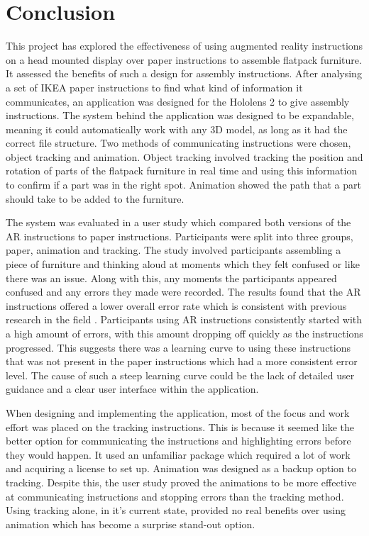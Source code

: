 \documentclass{l4proj}
\begin{document}
\chapter{Conclusion}  
\label{chap:conclusion}

This project has explored the effectiveness of using augmented reality instructions on a head mounted display over paper instructions to assemble flatpack furniture. It assessed the benefits of such a design for assembly instructions. After analysing a set of IKEA paper instructions to find what kind of information it communicates, an application was designed for the Hololens 2 to give assembly instructions. The system behind the application was designed to be expandable, meaning it could automatically work with any 3D model, as long as it had the correct file structure. Two methods of communicating instructions were chosen, object tracking and animation. Object tracking involved tracking the position and rotation of parts of the flatpack furniture in real time and using this information to confirm if a part was in the right spot. Animation showed the path that a part should take to be added to the furniture. 

The system was evaluated in a user study which compared both versions of the AR instructions to paper instructions. Participants were split into three groups, paper, animation and tracking. The study involved participants assembling a piece of furniture and thinking aloud at moments which they felt confused or like there was an issue. Along with this, any moments the participants appeared confused and any errors they made were recorded. The results found that the AR instructions offered a lower overall error rate which is consistent with previous research in the field \citep{Tang2004, yang_comparing_2020}. Participants using AR instructions consistently started with a high amount of errors, with this amount dropping off quickly as the instructions progressed. This suggests there was a learning curve to using these instructions that was not present in the paper instructions which had a more consistent error level. The cause of such a steep learning curve could be the lack of detailed user guidance and a clear user interface within the application.

When designing and implementing the application, most of the focus and work effort was placed on the tracking instructions. This is because it seemed like the better option for communicating the instructions and highlighting errors before they would happen. It used an unfamiliar package which required a lot of work and acquiring a license to set up. Animation was designed as a backup option to tracking. Despite this, the user study proved the animations to be more effective at communicating instructions and stopping errors than the tracking method. Using tracking alone, in it's current state, provided no real benefits over using animation which has become a surprise stand-out option.
\end{document}
